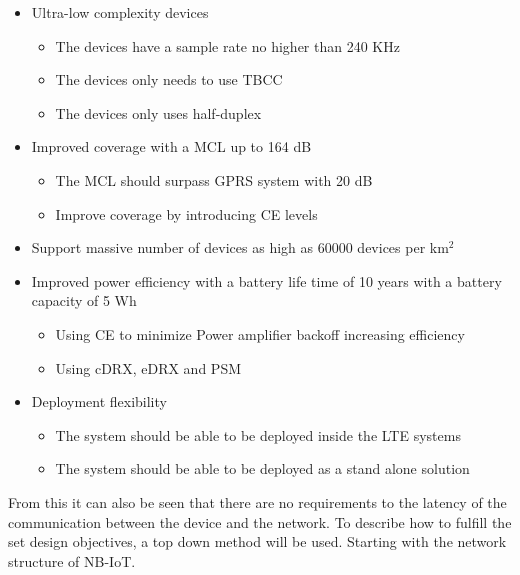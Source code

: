 \begin{itemize}
\item Ultra-low complexity devices
	\begin{itemize}
	\item The devices have a sample rate no higher than 240 KHz
	\item The devices only needs to use \gls{TBCC}
	\item The devices only uses half-duplex
	\end{itemize}
\item Improved coverage with a \gls{MCL} up to 164 dB
	\begin{itemize}
	\item The \gls{MCL} should surpass \gls{GPRS} system with 20 dB
	\item Improve coverage by introducing \gls{CE} levels 
	\end{itemize}
\item Support massive number of devices as high as 60000 devices per km$^2$
\item Improved power efficiency with a battery life time of 10 years with a battery capacity of 5 Wh
	\begin{itemize}
	\item Using \gls{CE} to minimize Power amplifier backoff increasing efficiency
	\item Using \gls{cDRX}, \gls{eDRX} and \gls{PSM} 
	\end{itemize}
\item Deployment flexibility
	\begin{itemize}
	\item The system should be able to be deployed inside the \gls{LTE} systems
	\item The system should be able to be deployed as a stand alone solution
	\end{itemize}
\end{itemize}

From this it can also be seen that there are no requirements to the latency of the communication between the device and the network. To describe how to fulfill the set design objectives, a top down method will be used. Starting with the network structure of \gls{NB-IoT}.




